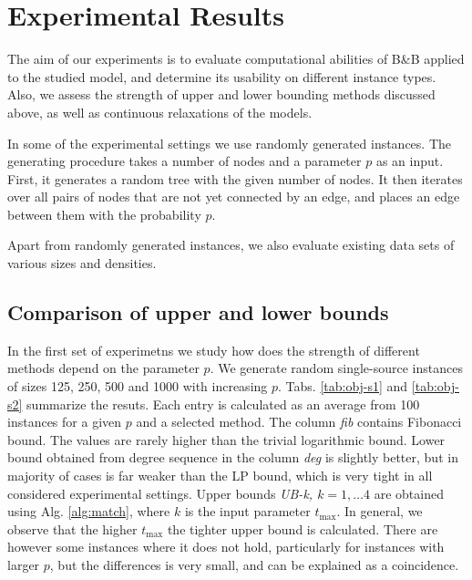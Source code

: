 \section{Experimental Results}

The aim of our experiments is to evaluate computational abilities of B\&B applied to the studied model, and determine its usability on different instance types.
Also, we assess the strength of upper and lower bounding methods discussed above, as well as continuous relaxations of the models.

In some of the experimental settings we use randomly generated instances.
The generating procedure takes a number of nodes and a parameter $p$ as an input.
First, it generates a random tree with the given number of nodes.
It then iterates over all pairs of nodes that are not yet connected by an edge, and places an edge between them with the probability $p$.

Apart from randomly generated instances, we also evaluate existing data sets of various sizes and densities.

\subsection{Comparison of upper and lower bounds}

In the first set of experimetns we study how does the strength of different methods depend on the parameter $p$.
We generate random single-source instances of sizes 125, 250, 500 and 1000 with increasing $p$.
Tabs. \ref{tab:obj-s1} and \ref{tab:obj-s2} summarize the resuts.
Each entry is calculated as an average from 100 instances for a given $p$ and a selected method.
The column \emph{fib} contains Fibonacci bound.
The values are rarely higher than the trivial logarithmic bound.
Lower bound obtained from degree sequence in the column \emph{deg} is slightly better, 
but in majority of cases is far weaker than the LP bound, which is very tight in all considered experimental settings.
Upper bounds \emph{UB-k, $k=1,\dots 4$} are obtained using Alg. \ref{alg:match}, where $k$ is the input parameter $t_{\text{max}}$.
In general, we observe that the higher $t_{\text{max}}$ the tighter upper bound is calculated.
There are however some instances where it does not hold, particularly for instances with larger $p$,  but the differences is very small, and can be explained as a coincidence.

